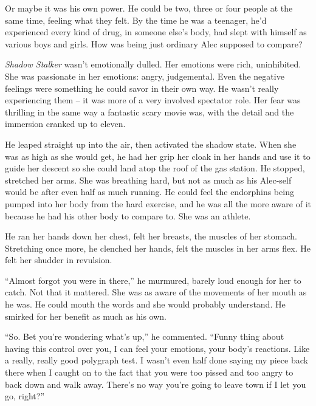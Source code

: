 Or maybe it was his own power.  He could be two, three or four people at the same time, feeling what they felt.  By the time he was a teenager, he'd experienced every kind of drug, in someone else's body, had slept with himself as various boys and girls.  How was being just ordinary Alec supposed to compare?



\emph{Shadow Stalker} wasn't emotionally dulled.  Her emotions were rich, uninhibited.  She was  passionate in her emotions: angry, judgemental.  Even the negative feelings were something he could savor in their own way.  He wasn't really experiencing them – it was more of a very involved spectator role.  Her fear was thrilling in the same way a fantastic scary movie was, with the detail and the immersion cranked up to eleven.



He leaped straight up into the air, then activated the shadow state.  When she was as high as she would get, he had her grip her cloak in her hands and use it to guide her descent so she could land atop the roof of the gas station.  He stopped, stretched her arms.  She was breathing hard, but not as much as his Alec-self would be after even half as much running.  He could feel the endorphins being pumped into her body from the hard exercise, and he was all the more aware of it because he had his other body to compare to.  She was an athlete.



He ran her hands down her chest, felt her breasts, the muscles of her stomach.  Stretching once more, he clenched her hands, felt the muscles in her arms flex.  He felt her shudder in revulsion.



``Almost forgot you were in there,'' he murmured, barely loud enough for her to catch.  Not that it mattered.  She was as aware of the movements of her mouth as he was.  He could mouth the words and she would probably understand.  He smirked for her benefit as much as his own.



``So.  Bet you're wondering what's up,'' he commented.  ``Funny thing about having this control over you, I can feel your emotions, your body's reactions.  Like a really, really good polygraph test.  I wasn't even half done saying my piece back there when I caught on to the fact that you were too pissed and too angry to back down and walk away.  There's no way you're going to leave town if I let you go, right?''



